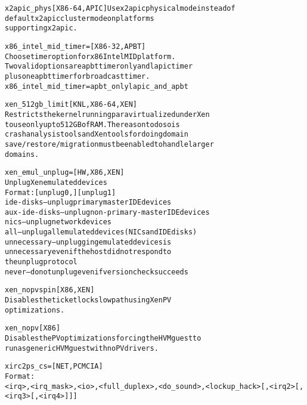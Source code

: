 \documentclass[a4paper,8pt,english]{sphinxmanual}
\begin{document}
\begin{alltt}
        x2apic\_phys     {[}X86-64,APIC{]} Use x2apic physical mode instead of
                        default x2apic cluster mode on platforms
                        supporting x2apic.

        x86\_intel\_mid\_timer= {[}X86-32,APBT{]}
                        Choose timer option for x86 Intel MID platform.
                        Two valid options are apbt timer only and lapic timer
                        plus one apbt timer for broadcast timer.
                        x86\_intel\_mid\_timer=apbt\_only \textbar{} lapic\_and\_apbt

        xen\_512gb\_limit         {[}KNL,X86-64,XEN{]}
                        Restricts the kernel running paravirtualized under Xen
                        to use only up to 512 GB of RAM. The reason to do so is
                        crash analysis tools and Xen tools for doing domain
                        save/restore/migration must be enabled to handle larger
                        domains.

        xen\_emul\_unplug=                {[}HW,X86,XEN{]}
                        Unplug Xen emulated devices
                        Format: {[}unplug0,{]}{[}unplug1{]}
                        ide-disks -- unplug primary master IDE devices
                        aux-ide-disks -- unplug non-primary-master IDE devices
                        nics -- unplug network devices
                        all -- unplug all emulated devices (NICs and IDE disks)
                        unnecessary -- unplugging emulated devices is
                                unnecessary even if the host did not respond to
                                the unplug protocol
                        never -- do not unplug even if version check succeeds

        xen\_nopvspin    {[}X86,XEN{]}
                        Disables the ticketlock slowpath using Xen PV
                        optimizations.

        xen\_nopv        {[}X86{]}
                        Disables the PV optimizations forcing the HVM guest to
                        run as generic HVM guest with no PV drivers.

        xirc2ps\_cs=     {[}NET,PCMCIA{]}
                        Format:
                        \textless{}irq\textgreater{},\textless{}irq\_mask\textgreater{},\textless{}io\textgreater{},\textless{}full\_duplex\textgreater{},\textless{}do\_sound\textgreater{},\textless{}lockup\_hack\textgreater{}{[},\textless{}irq2\textgreater{}{[},\textless{}irq3\textgreater{}{[},\textless{}irq4\textgreater{}{]}{]}{]}

\end{alltt}
\end{document}
